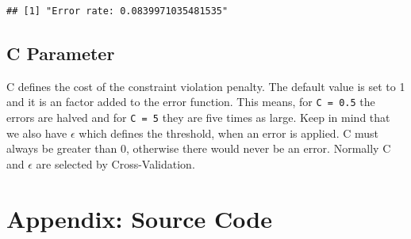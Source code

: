 \documentclass[]{article}
\begin{document}
\begin{verbatim}
## [1] "Error rate: 0.0839971035481535"
\end{verbatim}

\subsection{C Parameter}\label{c-parameter}

C defines the cost of the constraint violation penalty. The default
value is set to 1 and it is an factor added to the error function. This
means, for \texttt{C\ =\ 0.5} the errors are halved and for
\texttt{C\ =\ 5} they are five times as large. Keep in mind that we also
have \(\epsilon\) which defines the threshold, when an error is applied.
C must always be greater than 0, otherwise there would never be an
error. Normally C and \(\epsilon\) are selected by Cross-Validation.

\section{Appendix: Source Code}\label{appendix-source-code}
\end{document}
